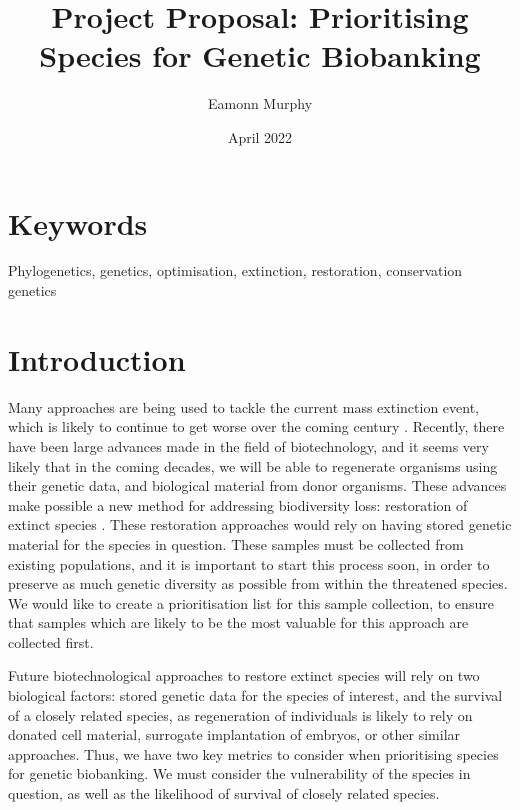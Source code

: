 \documentclass[11pt,titlepage]{article}
\title{Project Proposal: Prioritising Species for Genetic Biobanking}
\author{Eamonn Murphy}
\date{April 2022}
\begin{document}
	
	\maketitle
	
	\linenumbers
	\section{Keywords}
	
	Phylogenetics, genetics, optimisation, extinction, restoration, conservation genetics
	
	\section{Introduction}
	Many approaches are being used to tackle the current mass extinction event, which is likely to continue to get worse over the coming century \cite{ceballos_vertebrates_2020}. Recently, there have been large advances made in the field of biotechnology, and it seems very likely that in the coming decades, we will be able to regenerate organisms using their genetic data, and biological material from donor organisms. These advances make possible a new method for addressing biodiversity loss: restoration of extinct species \cite{sandler_ethical_2021}. These restoration approaches would rely on having stored genetic material for the species in question. These samples must be collected from existing populations, and it is important to start this process soon, in order to preserve as much genetic diversity as possible from within the threatened species. We would like to create a prioritisation list for this sample collection, to ensure that samples which are likely to be the most valuable for this approach are collected first.
	
	Future biotechnological approaches to restore extinct species will rely on two biological factors: stored genetic data for the species of interest, and the survival of a closely related species, as regeneration of individuals is likely to rely on donated cell material, surrogate implantation of embryos, or other similar approaches. Thus, we have two key metrics to consider when prioritising species for genetic biobanking. We must consider the vulnerability of the species in question, as well as the likelihood of survival of closely related species.
	
\end{document}
